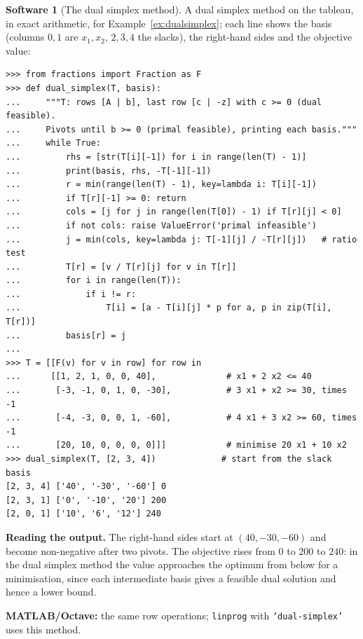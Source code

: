 \documentclass[11pt,a4paper]{article}
\numberwithin{equation}{section}
\theoremstyle{definition}
\newtheorem{software}[thm]{Software}
\begin{document}
\begin{software}[The dual simplex method]
\label{sw:dualsimplex}
A dual simplex method on the tableau, in exact arithmetic, for Example~\ref{ex:dualsimplex}; each line shows the basis (columns $0, 1$ are $x_1, x_2$, $2, 3, 4$ the slacks), the right-hand sides and the objective value:
{\small\begin{verbatim}
>>> from fractions import Fraction as F
>>> def dual_simplex(T, basis):
...     """T: rows [A | b], last row [c | -z] with c >= 0 (dual feasible).
...     Pivots until b >= 0 (primal feasible), printing each basis."""
...     while True:
...         rhs = [str(T[i][-1]) for i in range(len(T) - 1)]
...         print(basis, rhs, -T[-1][-1])
...         r = min(range(len(T) - 1), key=lambda i: T[i][-1])
...         if T[r][-1] >= 0: return
...         cols = [j for j in range(len(T[0]) - 1) if T[r][j] < 0]
...         if not cols: raise ValueError('primal infeasible')
...         j = min(cols, key=lambda j: T[-1][j] / -T[r][j])   # ratio test
...         T[r] = [v / T[r][j] for v in T[r]]
...         for i in range(len(T)):
...             if i != r:
...                 T[i] = [a - T[i][j] * p for a, p in zip(T[i], T[r])]
...         basis[r] = j
...
>>> T = [[F(v) for v in row] for row in
...      [[1, 2, 1, 0, 0, 40],              # x1 + 2 x2 <= 40
...       [-3, -1, 0, 1, 0, -30],           # 3 x1 + x2 >= 30, times -1
...       [-4, -3, 0, 0, 1, -60],           # 4 x1 + 3 x2 >= 60, times -1
...       [20, 10, 0, 0, 0, 0]]]            # minimise 20 x1 + 10 x2
>>> dual_simplex(T, [2, 3, 4])             # start from the slack basis
[2, 3, 4] ['40', '-30', '-60'] 0
[2, 3, 1] ['0', '-10', '20'] 200
[2, 0, 1] ['10', '6', '12'] 240
\end{verbatim}}
\textbf{Reading the output.} The right-hand sides start at $(40, -30, -60)$ and become non-negative after two pivots. The objective rises from $0$ to $200$ to $240$: in the dual simplex method the value approaches the optimum from below for a minimisation, since each intermediate basis gives a feasible dual solution and
hence a lower bound.

\textbf{MATLAB/Octave:} the same row operations; \texttt{linprog} with \texttt{'dual-simplex'} uses this method.
\end{software}
\end{document}
